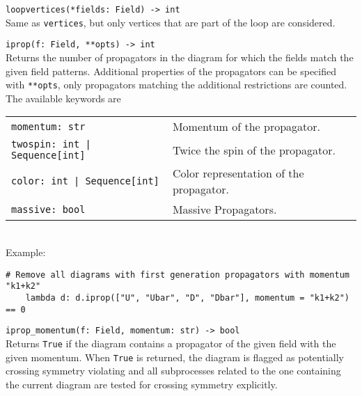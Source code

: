 \begin{basedescript}{\desclabelstyle{\pushlabel}}
   \item[\hspace{-1em}]\colorbox{gray!30}{\lstinline[style=pykw]|loopvertices(*fields: Field) -> int|} \vspace{0.1cm}\\
   Same as \texttt{vertices}, but only vertices that are part of the loop are considered.

   \item[\hspace{-1em}]\colorbox{gray!30}{\lstinline[style=pykw]|iprop(f: Field, **opts) -> int|} \vspace{0.1cm}\\
   Returns the number of propagators in the diagram for which the fields match the given field patterns. Additional properties of the propagators can be specified with \texttt{**opts}, only propagators matching the additional restrictions are counted. The available keywords are \\
   \def\arraystretch{1.5}
   \begin{tabular}{l l}
    \colorbox{gray!30}{\lstinline[style=pykw]|momentum: str|} & Momentum of the propagator. \\
    \colorbox{gray!30}{\lstinline[style=pykw]{twospin: int | Sequence[int]}} & Twice the spin of the propagator. \\
    \colorbox{gray!30}{\lstinline[style=pykw]{color: int | Sequence[int]}} & Color representation of the propagator. \\
    \colorbox{gray!30}{\lstinline[style=pykw]|massive: bool|} & Massive Propagators.
   \end{tabular}
   \def\arraystretch{1.0}
   \vspace{0.2cm} \\
   Example:
   \begin{lstlisting}[style=pykw]
    # Remove all diagrams with first generation propagators with momentum "k1+k2"
    lambda d: d.iprop(["U", "Ubar", "D", "Dbar"], momentum = "k1+k2") == 0
   \end{lstlisting}

   \item[\hspace{-1em}]\colorbox{gray!30}{\lstinline[style=pykw]|iprop_momentum(f: Field, momentum: str) -> bool|} \vspace{0.1cm}\\
   Returns \texttt{True} if the diagram contains a propagator of the given field with the given momentum. When \texttt{True} is returned, the diagram is flagged as potentially crossing symmetry violating and all subprocesses related to the one containing the current diagram are tested for crossing symmetry explicitly.


\end{basedescript}
